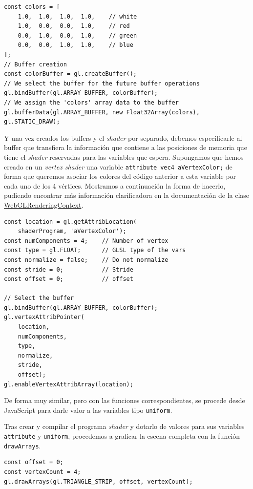 \begin{lstlisting}
const colors = [
    1.0,  1.0,  1.0,  1.0,    // white
    1.0,  0.0,  0.0,  1.0,    // red
    0.0,  1.0,  0.0,  1.0,    // green
    0.0,  0.0,  1.0,  1.0,    // blue
];
// Buffer creation
const colorBuffer = gl.createBuffer();
// We select the buffer for the future buffer operations
gl.bindBuffer(gl.ARRAY_BUFFER, colorBuffer);
// We assign the 'colors' array data to the buffer
gl.bufferData(gl.ARRAY_BUFFER, new Float32Array(colors), gl.STATIC_DRAW);
\end{lstlisting}

Y una vez creados los buffers y el \textit{shader} por separado, debemos especificarle al buffer que transfiera la información que contiene a las posiciones de memoria que tiene el \textit{shader} reservadas para las variables que espera. Supongamos que hemos creado en un \textit{vertex shader} una variable \verb|attribute vec4 aVertexColor;| de forma que queremos asociar los colores del código anterior a esta variable por cada uno de los 4 vértices. Mostramos a continuación la forma de hacerlo, pudiendo encontrar más información clarificadora en la documentación de la clase \href{https://developer.mozilla.org/en-US/docs/Web/API/WebGLRenderingContext}{WebGLRenderingContext}.

\begin{lstlisting}
const location = gl.getAttribLocation(
    shaderProgram, 'aVertexColor');
const numComponents = 4;    // Number of vertex
const type = gl.FLOAT;      // GLSL type of the vars
const normalize = false;    // Do not normalize
const stride = 0;           // Stride
const offset = 0;           // offset

// Select the buffer
gl.bindBuffer(gl.ARRAY_BUFFER, colorBuffer);
gl.vertexAttribPointer(
    location,
    numComponents,
    type,
    normalize,
    stride,
    offset);
gl.enableVertexAttribArray(location);
\end{lstlisting}

De forma muy similar, pero con las funciones correspondientes, se procede desde JavaScript para darle valor a las variables tipo \verb|uniform|.

Tras crear y compilar el programa \textit{shader} y dotarlo de valores para sus variables \verb|attribute| y \verb|uniform|, procedemos a graficar la escena completa con la función \verb|drawArrays|.

\begin{lstlisting}
const offset = 0;
const vertexCount = 4;
gl.drawArrays(gl.TRIANGLE_STRIP, offset, vertexCount);
\end{lstlisting}

